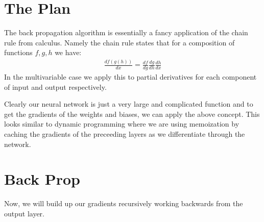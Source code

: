 \documentclass[12pt]{article}
\begin{document}
\section*{The Plan}
The back propagation algorithm is essentially a fancy application of
the chain rule from calculus. Namely the chain rule states that for a composition
of functions $f, g, h$ we have:
\begin{align*}
   \frac{df(g(h))} {dx} = \frac{df}{dg}\frac{dg}{dh}\frac{dh}{dx}
\end{align*}
In the multivariable case we apply this to partial derivatives for each component of input
and output respectively.


Clearly our neural network is just a very large and complicated function and to get the gradients
of the weights and biases, we can apply the above concept. This looks similar to dynamic programming
where we are using memoization by caching the gradients of the preceeding layers as we differentiate
through the network.

\section*{Back Prop}
Now, we will build up our gradients recursively working backwards from the output layer.
\end{document}
